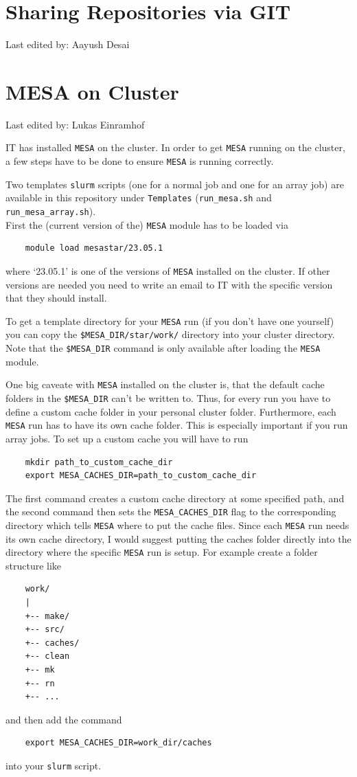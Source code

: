 \documentclass{article}
\newcommand{\setlasteditor}[1]{\gdef\lasteditor{#1}}
\newcommand{\lastedited}{%
    \vspace{1mm} {\footnotesize Last edited by: \lasteditor} \vspace{3mm}
    \newline

}
\begin{document}
\section{Sharing Repositories via GIT}
\setlasteditor{Aayush Desai}
\lastedited

\section{MESA on Cluster}
\setlasteditor{Lukas Einramhof}
\lastedited
IT has installed \texttt{MESA} on the cluster. In order to get \texttt{MESA} running on the cluster, a few steps have to be done to ensure \texttt{MESA} is running correctly.

Two templates \texttt{slurm} scripts (one for a normal job and one for an array job) are available in this repository under \texttt{Templates} (\texttt{run\_mesa.sh} and \texttt{run\_mesa\_array.sh}). \\

First the (current version of the) \texttt{MESA} module has to be loaded via
\begin{verbatim}
    module load mesastar/23.05.1
\end{verbatim}
where `23.05.1' is one of the versions of \texttt{MESA} installed on the cluster. 
If other versions are needed you need to write an email to IT with the specific version that they should install.

To get a template directory for your \texttt{MESA} run (if you don't have one yourself) you can copy the \texttt{\$MESA\_DIR/star/work/} directory into your cluster directory.
Note that the \texttt{\$MESA\_DIR} command is only available after loading the \texttt{MESA} module.

One big caveate with \texttt{MESA} installed on the cluster is, that the default cache folders in the \texttt{\$MESA\_DIR} can't be written to.
Thus, for every run you have to define a custom cache folder in your personal cluster folder. Furthermore, each \texttt{MESA} run has to have its own cache folder. This is especially important if you run array jobs.
To set up a custom cache you will have to run
\begin{verbatim}
    mkdir path_to_custom_cache_dir
    export MESA_CACHES_DIR=path_to_custom_cache_dir
\end{verbatim}
The first command creates a custom cache directory at some specified path, and the second command then sets the \texttt{MESA\_CACHES\_DIR} flag to the corresponding directory which tells \texttt{MESA} where to put the cache files.
Since each \texttt{MESA} run needs its own cache directory, I would suggest putting the caches folder directly into the directory where the specific \texttt{MESA} run is setup. For example create a folder structure like
\begin{verbatim}
    work/
    |
    +-- make/
    +-- src/
    +-- caches/
    +-- clean
    +-- mk
    +-- rn
    +-- ...
\end{verbatim}
and then add the command
\begin{verbatim}
    export MESA_CACHES_DIR=work_dir/caches
\end{verbatim}
into your \texttt{slurm} script.
\end{document}
